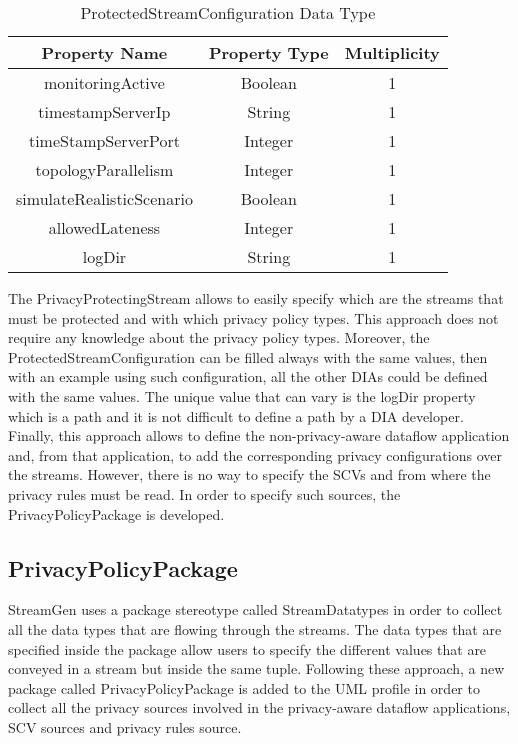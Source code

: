 \begin{table}[h!]
\centering
	\begin{tabular}{||c|c|c||} 
	\hline\hline
	Property Name & Property Type & Multiplicity \\ [1ex] 
	\hline\hline
	monitoringActive & Boolean & 1 \\
	\hline
	timestampServerIp & String & 1 \\
	\hline
	timeStampServerPort & Integer & 1 \\
	\hline
	topologyParallelism & Integer & 1 \\
	\hline
	simulateRealisticScenario & Boolean & 1 \\
	\hline
	allowedLateness & Integer & 1 \\
	\hline
	logDir & String & 1 \\
	\hline\hline
	\end{tabular}
\caption{ProtectedStreamConfiguration Data Type}
\label{ProtectedStreamConfiguration Data Type}
\end{table}

The PrivacyProtectingStream allows to easily specify which are the streams that must be protected and with which privacy policy types. This approach does not require any knowledge about the privacy policy types. Moreover, the ProtectedStreamConfiguration can be filled always with the same values, then with an example using such configuration, all the other DIAs could be defined with the same values. The unique value that can vary is the logDir property which is a path and it is not difficult to define a path by a DIA developer. Finally, this approach allows to define the non-privacy-aware dataflow application and, from that application, to add the corresponding privacy configurations over the streams. However, there is no way to specify the SCVs and from where the privacy rules must be read. In order to specify such sources, the PrivacyPolicyPackage is developed.

\subsection{PrivacyPolicyPackage}

StreamGen uses a package stereotype called StreamDatatypes in order to collect all the data types that are flowing through the streams. The data types that are specified inside the package allow users to specify the different values that are conveyed in a stream but inside the same tuple. Following these approach, a new package called PrivacyPolicyPackage is added to the UML profile in order to collect all the privacy sources involved in the privacy-aware dataflow applications, SCV sources and privacy rules source.

